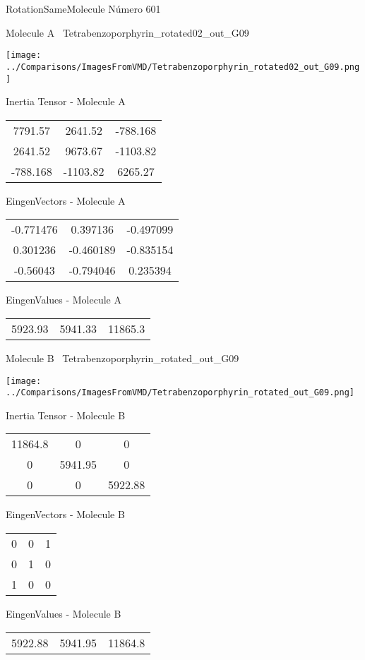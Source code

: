 \vtab[-3cm]
\begin{center}
{\large RotationSameMolecule \tab Número 601}
\end{center}
\begin{multicols}{2}
\begin{center}

Molecule A \
Tetrabenzoporphyrin\_rotated02\_out\_G09

\texttt{[image: ../Comparisons/ImagesFromVMD/Tetrabenzoporphyrin\_rotated02\_out\_G09.png]}

Inertia Tensor - Molecule A \\
\begin{tabular}{|c c c|}
7791.57	 & 	2641.52	 & 	-788.168	 \\
2641.52	 & 	9673.67	 & 	-1103.82	 \\
-788.168	 & 	-1103.82	 & 	6265.27
\end{tabular}

\vtab
 EingenVectors - Molecule A     \\
\begin{tabular}{|c c c|}
-0.771476	 & 	0.397136	 & 	-0.497099	 \\
0.301236	 & 	-0.460189	 & 	-0.835154	 \\
-0.56043	 & 	-0.794046	 & 	0.235394
\end{tabular}

\vtab
 EingenValues - Molecule A     \\
\begin{tabular}{|c c c|}
5923.93	 & 	5941.33	 & 	11865.3	 \\
\end{tabular}
\columnbreak

Molecule B \
Tetrabenzoporphyrin\_rotated\_out\_G09

\texttt{[image: ../Comparisons/ImagesFromVMD/Tetrabenzoporphyrin\_rotated\_out\_G09.png]}

Inertia Tensor - Molecule B \\
\begin{tabular}{|c c c|}
11864.8	 & 	0	 & 	0	 \\
0	 & 	5941.95	 & 	0	 \\
0	 & 	0	 & 	5922.88
\end{tabular}

\vtab
 EingenVectors - Molecule B     \\
\begin{tabular}{|c c c|}
0	 & 	0	 & 	1	 \\
0	 & 	1	 & 	0	 \\
1	 & 	0	 & 	0
\end{tabular}

\vtab
 EingenValues - Molecule B     \\
\begin{tabular}{|c c c|}
5922.88	 & 	5941.95	 & 	11864.8	 \\
\end{tabular}

\end{center}
\end{multicols}


